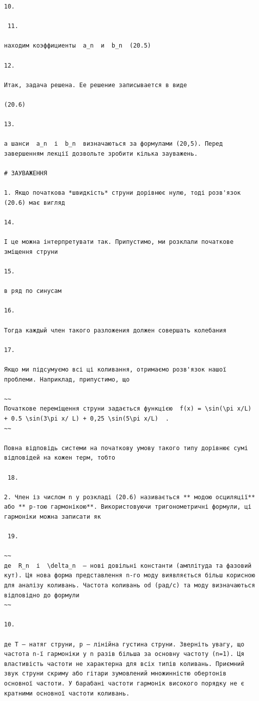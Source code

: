 \documentclass[
  ukrainian,
]{article}
\begin{document}
\begin{verbatim}
10.

 11.

находим коэффициенты  a_n  и  b_n  (20.5)

12.

Итак, задача решена. Ее решение записывается в виде

(20.6)

13.

а шанси  a_n  і  b_n  визначаються за формулами (20,5). Перед завершенням лекції дозвольте зробити кілька зауважень.

# ЗАУВАЖЕННЯ

1. Якщо початкова *швидкість* струни дорівнює нулю, тоді розв'язок (20.6) має вигляд

14.

І це можна інтерпретувати так. Припустимо, ми розклали початкове зміщення струни

15.

в ряд по синусам

16.

Тогда каждый член такого разложения должен совершать колебания

17.

Якщо ми підсумуємо всі ці коливання, отримаємо розв'язок нашої проблеми. Наприклад, припустимо, що

~~
Початкове переміщення струни задається функцією  f(x) = \sin(\pi x/L) + 0.5 \sin(3\pi x/ L) + 0,25 \sin(5\pi x/L)  .
~~

Повна відповідь системи на початкову умову такого типу дорівнює сумі відповідей на кожен терм, тобто

 18. 

2. Член із числом n у розкладі (20.6) називається ** модою осциляції** або ** p-тою гармонікою**. Використовуючи тригонометричні формули, ці гармоніки можна записати як

 19.

~~
де  R_n  і  \delta_n  — нові довільні константи (амплітуда та фазовий кут). Ця нова форма представлення n-го моду виявляється більш корисною для аналізу коливань. Частота коливань od (рад/с) та моду визначаються відповідно до формули
~~

10.

де T — натяг струни, p — лінійна густина струни. Зверніть увагу, що частота n-ї гармоніки у n разів більша за основну частоту (n=1). Ця властивість частоти не характерна для всіх типів коливань. Приємний звук струни скриму або гітари зумовлений множинністю обертонів основної частоти. У барабані частоти гармонік високого порядку не є кратними основної частоти коливань.


\end{verbatim}
\end{document}

